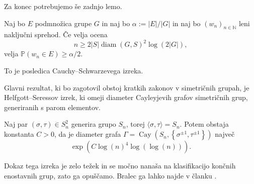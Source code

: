 Za konec potrebujemo še zadnjo lemo. 
\begin{lema}\label{lem_posledica_neenakosti_csb}
Naj bo $E$ podmnožica grupe $G$ in naj bo $\alpha := \lvert E \rvert / \lvert G \rvert$ in naj bo $(w_n)_{n \in  \mathbb{N}}$ leni naključni sprehod.
Če velja ocena \begin{equation*}
n \ge 2 \lvert S \rvert \operatorname{diam}(G, S)^2 \log(2 \lvert G \rvert ), 
\end{equation*}  
    velja $\mathbb{P}(w_n \in E) \ge \alpha / 2$.
\end{lema}  
\begin{dokaz}
To je posledica Cauchy--Schwarzevega izreka. %
\end{dokaz}


Glavni rezultat, ki bo zagotovil obstoj kratkih zakonov v simetričnih grupah, je Helfgott--Seressov izrek, ki omeji diameter Cayleyjevih grafov simetričnih grup, generiranih s parom elementov. \begin{izrek}\label{izr_Helfgott_Seress}
Naj par $(\sigma, \tau) \in S_n^2$ generira grupo $S_n$, torej $\langle \sigma, \tau \rangle = S_n$. Potem obstaja konstanta $C > 0$, da je diameter grafa $\Gamma = \operatorname{Cay}(S_n, \left\{ \sigma^{\pm 1}, \tau^{\pm 1} \right\} )$ največ 
\begin{equation*}
\exp(C \log(n)^{4} \log(\log(n))).
\end{equation*}
\end{izrek}  
Dokaz tega izreka je zelo težek in se močno nanaša na klasifikacijo končnih enostavnih grup, zato ga opuščamo. Bralec ga lahko najde v članku \cite{Helfgott_Seress_2013}.
